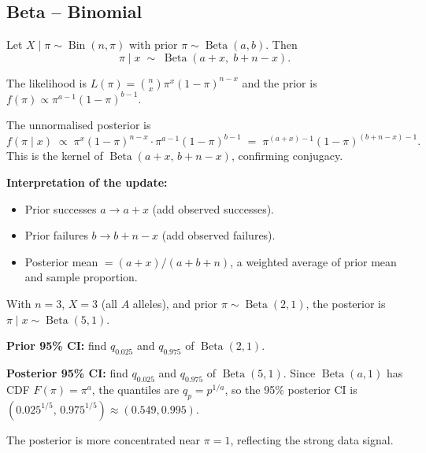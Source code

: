 \documentclass[11pt, a4paper]{article}
\begin{document}
\subsection*{Beta -- Binomial}

\begin{thmbox}
Let $X \mid \pi \sim \operatorname{Bin}(n, \pi)$ with prior $\pi \sim \operatorname{Beta}(a, b)$. Then
\[
  \pi \mid x \;\sim\; \operatorname{Beta}(a + x,\; b + n - x).
\]
\end{thmbox}

\begin{exbox}
The likelihood is $L(\pi) = \binom{n}{x}\pi^x(1-\pi)^{n-x}$ and the prior is $f(\pi) \propto \pi^{a-1}(1-\pi)^{b-1}$.

The unnormalised posterior is
\[
  f(\pi \mid x) \;\propto\; \pi^x(1-\pi)^{n-x} \cdot \pi^{a-1}(1-\pi)^{b-1}
  \;=\; \pi^{(a+x)-1}(1-\pi)^{(b+n-x)-1}.
\]
This is the kernel of $\operatorname{Beta}(a+x,\, b+n-x)$, confirming conjugacy. \medskip

\textbf{Interpretation of the update:}
\begin{itemize}
  \item Prior successes $a \to a + x$ (add observed successes).
  \item Prior failures $b \to b + n - x$ (add observed failures).
  \item Posterior mean $= (a+x)/(a+b+n)$, a weighted average of prior mean and sample proportion.
\end{itemize}
\end{exbox}

\begin{exbox}
With $n = 3$, $X = 3$ (all $A$ alleles), and prior $\pi \sim \operatorname{Beta}(2,1)$, the posterior is $\pi \mid x \sim \operatorname{Beta}(5, 1)$.

\textbf{Prior 95\% CI:} find $q_{0.025}$ and $q_{0.975}$ of $\operatorname{Beta}(2,1)$.

\textbf{Posterior 95\% CI:} find $q_{0.025}$ and $q_{0.975}$ of $\operatorname{Beta}(5,1)$. Since $\operatorname{Beta}(a,1)$ has CDF $F(\pi) = \pi^a$, the quantiles are $q_p = p^{1/a}$, so the 95\% posterior CI is $(0.025^{1/5},\, 0.975^{1/5}) \approx (0.549, 0.995)$.

The posterior is more concentrated near $\pi = 1$, reflecting the strong data signal.
\end{exbox}
\end{document}
